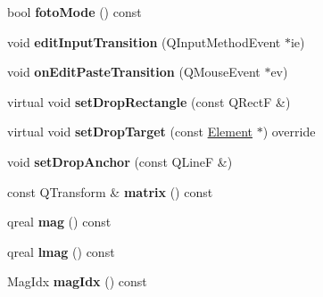 \begin{DoxyCompactItemize}
\item 
\mbox{\label{class_ms_1_1_score_view_a920bfb0637f25f850df1c5483a0cff5b}} 
bool {\bfseries foto\+Mode} () const
\item 
\mbox{\label{class_ms_1_1_score_view_af5a22e85ab67e9eb39ff5930a10bf7b3}} 
void {\bfseries edit\+Input\+Transition} (Q\+Input\+Method\+Event $\ast$ie)
\item 
\mbox{\label{class_ms_1_1_score_view_abb9fa60d5abf44d9cc57e894561717ef}} 
void {\bfseries on\+Edit\+Paste\+Transition} (Q\+Mouse\+Event $\ast$ev)
\item 
\mbox{\label{class_ms_1_1_score_view_ab05a183703ec6ede5d3c33ffa3e06ad4}} 
virtual void {\bfseries set\+Drop\+Rectangle} (const Q\+RectF \&)
\item 
\mbox{\label{class_ms_1_1_score_view_a5f99b75794d951a78362de327c5028c2}} 
virtual void {\bfseries set\+Drop\+Target} (const \hyperlink{class_ms_1_1_element}{Element} $\ast$) override
\item 
\mbox{\label{class_ms_1_1_score_view_a61daa0e6dbbccba0f7c0b5e6a27af082}} 
void {\bfseries set\+Drop\+Anchor} (const Q\+LineF \&)
\item 
\mbox{\label{class_ms_1_1_score_view_aa0608b1437dd395eac0be2fb81ff20a0}} 
const Q\+Transform \& {\bfseries matrix} () const
\item 
\mbox{\label{class_ms_1_1_score_view_a8a92b17d916c57cc92b62842fb121a48}} 
qreal {\bfseries mag} () const
\item 
\mbox{\label{class_ms_1_1_score_view_a637ce68967431f861a075f74af901f75}} 
qreal {\bfseries lmag} () const
\item 
\mbox{\label{class_ms_1_1_score_view_a5d73140e28c25e74968cbe4ba087e048}} 
Mag\+Idx {\bfseries mag\+Idx} () const
\item 
\mbox{\label{class_ms_1_1_score_view_af5821b27ee2081bb8805a8701f920db7}} 

\end{DoxyCompactItemize}
